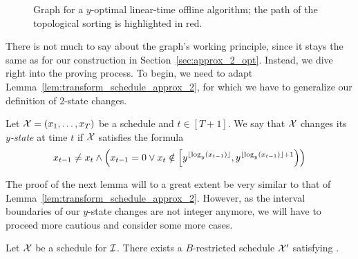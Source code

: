 \begin{figure}[ht]

\caption{Graph for a $y$-optimal linear-time offline algorithm; the path of the topological sorting is highlighted in red.}
\label{fig:graph_lin_approx_y}
\end{figure}
There is not much to say about the graph's working principle, since it stays the same as for our construction in Section~\ref{sec:approx_2_opt}. Instead, we dive right into the proving process. To begin, we need to adapt Lemma~\ref{lem:transform_schedule_approx_2}, for which we have to generalize our definition of 2-state changes.
\begin{defn}\label{defn:y_state_changes}
Let $\mathcal{X}=(x_1,\dotsc,x_T)$ be a schedule and $t\in[T+1]$. We say that $\mathcal{X}$ changes its \emph{$y$-state} at time $t$ if $\mathcal{X}$ satisfies the formula
\begin{equation*}
	x_{t-1}\neq x_t\land \left(x_{t-1}=0 \lor x_t\notin\left[y^{\lfloor\log_y(x_{t-1})\rfloor},y^{\lfloor\log_y(x_{t-1})\rfloor+1}\right)\right)
\end{equation*}
\end{defn}
The proof of the next lemma will to a great extent be very similar to that of Lemma~\ref{lem:transform_schedule_approx_2}. However, as the interval boundaries of our $y$-state changes are not integer anymore, we will have to proceed more cautious and consider some more cases.
\begin{lem}
Let $\mathcal{X}$ be a schedule for $\mathcal{I}$. There exists a $B$-restricted schedule $\mathcal{X}'$ satisfying .
\end{lem}
